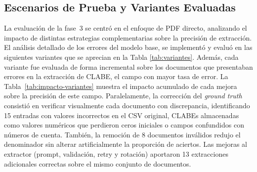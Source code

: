 \subsection{Escenarios de Prueba y Variantes Evaluadas}

La evaluación de la fase~3 se centró en el enfoque de PDF directo, analizando el impacto de distintas estrategias complementarias sobre la precisión de extracción. El análisis detallado de los errores del modelo base, se implementó y evaluó en las siguientes variantes que se aprecian en la Tabla \ref{tab:variantes}. Además, cada variante fue evaluada de forma incremental sobre los documentos que presentaban errores en la extracción de CLABE, el campo con mayor tasa de error. La Tabla~\ref{tab:impacto-variantes} muestra el impacto acumulado de cada mejora sobre la precisión de este campo. Paralelamente, la corrección del \textit{ground truth} consistió en verificar visualmente cada documento con discrepancia, identificando 15 entradas con valores incorrectos en el CSV original, CLABEs almacenadas como valores numéricos que perdieron ceros iniciales o campos confundidos con números de cuenta. También, la remoción de 8 documentos inválidos redujo el denominador sin alterar artificialmente la proporción de aciertos. Las mejoras al extractor (prompt, validación, retry y rotación) aportaron 13 extracciones adicionales correctas sobre el mismo conjunto de documentos.

\begin{table}[H]
\centering
\vspace{6pt}
\caption{Variantes evaluadas en la fase de PDF directo}
\label{tab:variantes}
\end{table}



